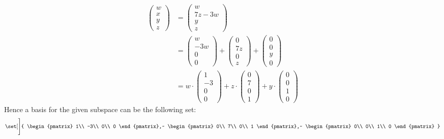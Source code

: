 \documentclass[12pt,letterpaper,fleqn]{article}
\theoremstyle{definition}
\begin{document}
\begin{equation*}
\begin{split}
\begin{pmatrix}
w\\
x\\
y\\
z
\end{pmatrix} &=
\begin{pmatrix}
w\\
7z - 3w\\
y\\
z
\end{pmatrix}\\
&= \begin{pmatrix}
w\\
-3w\\
0\\
0
\end{pmatrix} +
\begin{pmatrix}
0\\
7z\\
0\\
z
\end{pmatrix} +
\begin{pmatrix}
0\\
0\\
y\\
0
\end{pmatrix}\\
&= w \cdot \begin{pmatrix}
1\\
-3\\
0\\
0
\end{pmatrix} + 
z \cdot \begin{pmatrix}
0\\
7\\
0\\
1
\end{pmatrix} +
y \cdot \begin{pmatrix}
0\\
0\\
1\\
0
\end{pmatrix}
\end{split}
\end{equation*}
Hence a basis for the given subspace can be the following set:
\begin{equation}
\set[\Bigg]{
\begin{pmatrix}
1\\
-3\\
0\\
0
\end{pmatrix},~
\begin{pmatrix}
0\\
7\\
0\\
1
\end{pmatrix},~
\begin{pmatrix}
0\\
0\\
1\\
0
\end{pmatrix}
}
\end{equation}
\newpage
\end{document}

